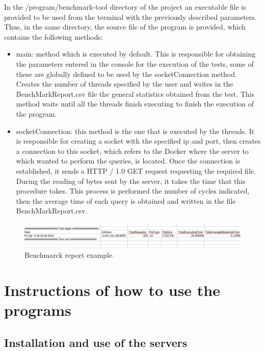 \documentclass{article}
\begin{document}
In the /program/benchmark-tool directory of the project an executable file is provided to be used from the terminal with the previously described parameters. Thus, in the same directory, the source file of the program is provided, which contains the following methods:
\begin{itemize}
    \item main: method which is executed by default. This is responsible for obtaining the parameters entered in the console for the execution of the tests, some of these are globally defined to be used by the socketConnection method. Creates the number of threads specified by the user and writes in the BenchMarkReport.csv file the general statistics obtained from the test.  This method waits until all the threads finish executing to finish the execution of the program.
    \item socketConnection: this method is the one that is executed by the threads. It is responsible for creating a socket with the specified ip and port, then creates a connection to this socket, which refers to the Docker where the server to which wanted to perform the queries, is located. Once the connection is established, it sends a HTTP / 1.0 GET request requesting the required file. During the reading of bytes sent by the server, it takes the time that this procedure takes. This process is performed the number of cycles indicated, then the average time of each query is obtained and written in the file BenchMarkReport.csv.
\end{itemize}

\begin{figure}[H]
	\centering
	\captionsetup{justification=centering, margin=1cm}
    \includegraphics[width=\columnwidth]{benchmarkReportExamp.png}
    \caption{Benchmarck report example.}
	\label{fig:benchReportExamp}
\end{figure}

\section{Instructions of how to use the programs}

\subsection{Installation and use of the servers}
\end{document}
